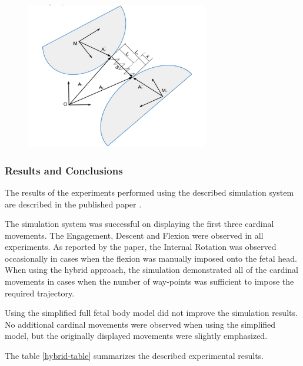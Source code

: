 \begin{figure}
  \centering
    \includegraphics[width=80mm]{sections/methodology/images/basic/mass-spring-detail.png}
  \caption[The detailed representation of a single spring attachment in the full body fetal mass-spring model. ]{\label{mass-spring-detail}}
\end{figure}

\subsubsection{Results and Conclusions}

The results of the experiments performed using the described simulation system are described in the published paper \cite{gerikhanov2013}.

The simulation system was successful on displaying the first three cardinal movements. The Engagement, Descent and Flexion were observed in all experiments. As reported by the paper, the Internal Rotation was observed occasionally in cases when the flexion was manually imposed onto the fetal head. When using the hybrid approach, the simulation demonstrated all of the cardinal movements in cases when the number of way-points was sufficient to impose the required trajectory.

Using the simplified full fetal body model did not improve the simulation results. No additional cardinal movements were observed when using the simplified model, but the originally displayed movements were slightly emphasized.

The table \ref{hybrid-table} summarizes the described experimental results.


